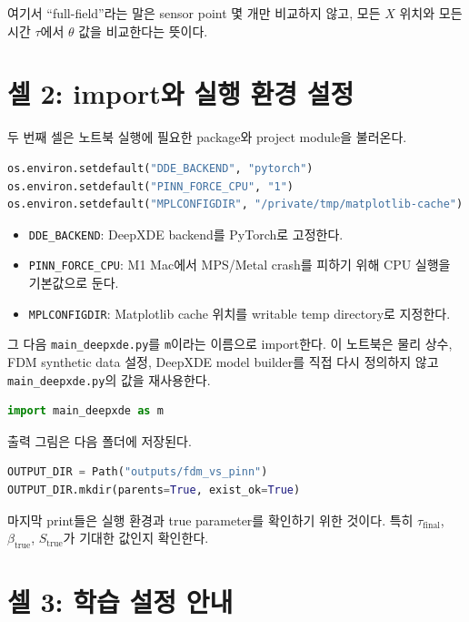 \documentclass[11pt]{article}
\begin{document}
여기서 ``full-field''라는 말은 sensor point 몇 개만 비교하지 않고, 모든 \(X\) 위치와 모든 시간 \(\tau\)에서 \(\theta\) 값을 비교한다는 뜻이다.

\section{셀 2: import와 실행 환경 설정}

두 번째 셀은 노트북 실행에 필요한 package와 project module을 불러온다.

\begin{lstlisting}[language=Python]
os.environ.setdefault("DDE_BACKEND", "pytorch")
os.environ.setdefault("PINN_FORCE_CPU", "1")
os.environ.setdefault("MPLCONFIGDIR", "/private/tmp/matplotlib-cache")
\end{lstlisting}

\begin{itemize}[leftmargin=*]
    \item \texttt{DDE\_BACKEND}: DeepXDE backend를 PyTorch로 고정한다.
    \item \texttt{PINN\_FORCE\_CPU}: M1 Mac에서 MPS/Metal crash를 피하기 위해 CPU 실행을 기본값으로 둔다.
    \item \texttt{MPLCONFIGDIR}: Matplotlib cache 위치를 writable temp directory로 지정한다.
\end{itemize}

그 다음 \texttt{main\_deepxde.py}를 \texttt{m}이라는 이름으로 import한다.
이 노트북은 물리 상수, FDM synthetic data 설정, DeepXDE model builder를 직접 다시 정의하지 않고 \texttt{main\_deepxde.py}의 값을 재사용한다.

\begin{lstlisting}[language=Python]
import main_deepxde as m
\end{lstlisting}

출력 그림은 다음 폴더에 저장된다.

\begin{lstlisting}[language=Python]
OUTPUT_DIR = Path("outputs/fdm_vs_pinn")
OUTPUT_DIR.mkdir(parents=True, exist_ok=True)
\end{lstlisting}

마지막 print들은 실행 환경과 true parameter를 확인하기 위한 것이다.
특히 \(\tau_{\mathrm{final}}\), \(\beta_{\mathrm{true}}\), \(S_{\mathrm{true}}\)가 기대한 값인지 확인한다.

\section{셀 3: 학습 설정 안내}
\end{document}
